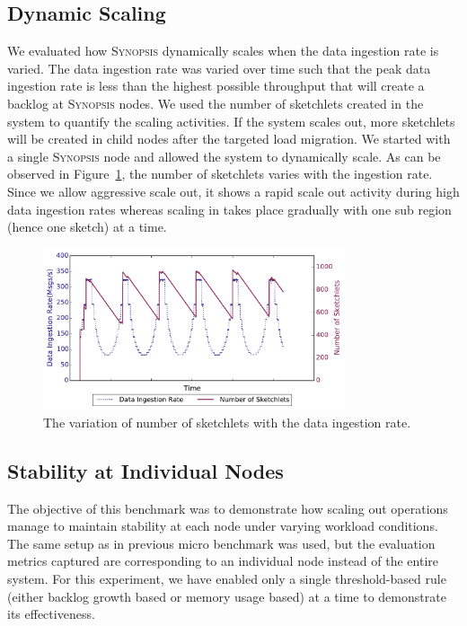 \subsection{Dynamic Scaling}
We evaluated how \textsc{Synopsis} dynamically scales when the data ingestion rate is varied.
The data ingestion rate was varied over time such that the peak data ingestion rate is less than the highest possible throughput that will create a backlog at \textsc{Synopsis} nodes.
We used the number of sketchlets created in the system to quantify the scaling activities.
If the system scales out, more sketchlets will be created in child nodes after the targeted load migration.
We started with a single \textsc{Synopsis} node and allowed the system to dynamically scale.
As can be observed in Figure~\ref{fig:dyn-scaling}, the number of sketchlets varies with the ingestion rate.
Since we allow aggressive scale out, it shows a rapid scale out activity during high data ingestion rates whereas scaling in takes place gradually with one sub region (hence one sketch) at a time. \\
\begin{figure}
    \centerline{\includegraphics[width=3.5in]{figures/dyn-scaling.pdf}}
    \caption{The variation of number of sketchlets with the data ingestion rate.}
    \label{fig:dyn-scaling}
\end{figure}

\subsection{Stability at Individual Nodes}
The objective of this benchmark was to demonstrate how scaling out operations manage to maintain stability at each node under varying workload conditions.
The same setup as in previous micro benchmark was used, but the evaluation metrics captured are corresponding to an individual node instead of the entire system.
For this experiment, we have enabled only a single threshold-based rule (either backlog growth based or memory usage based) at a time to demonstrate its effectiveness.

